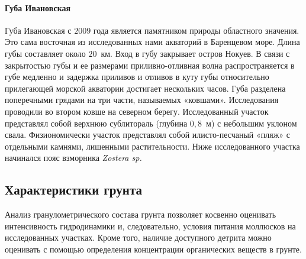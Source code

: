     \paragraph{Губа Ивановская}
Губа Ивановская с $2009$ года является памятником природы областного значения. 
Это сама восточная из исследованных нами акваторий в Баренцевом море. 
Длина губы составляет около $20$~км. 
Вход в губу закрывает  остров Нокуев.
В связи с  закрытостью губы и ее размерами приливно-отливная волна   распространяется   в   губе   медленно   и   задержка   приливов   и   отливов   в   куту   губы относительно прилегающей морской акватории достигает нескольких часов. 
Губа   разделена   поперечными   грядами   на   три   части,   называемых   «ковшами». 
Исследования   проводили   во   втором   ковше   на   северном   берегу.   
Исследованный   участок представлял   собой   верхнюю   сублитораль   (глубина   $0,8$~м)   с   небольшим   уклоном   свала. 
Физиономически участок представлял собой илисто-песчаный «пляж» с отдельными камнями, лишенными растительности. 
Ниже исследованного участка начинался пояс взморника {\it Zostera  sp.} 

        \subsection{Характеристики грунта}
Анализ   гранулометрического   состава   грунта   позволяет   косвенно   оценивать  интенсивность   гидродинамики   и,   следовательно,   условия   питания   моллюсков   на исследованных   участках.   
Кроме   того,   наличие   доступного   детрита   можно   оценивать   с помощью определения концентрации органических веществ в грунте.

